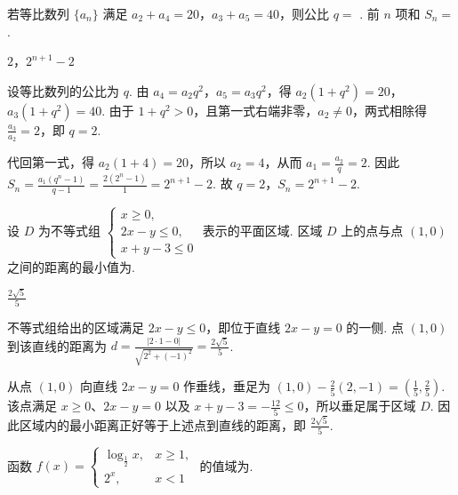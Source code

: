 \begin{problem}
若等比数列 \(\{a_{n}\}\) 满足 \(a_{2} + a_{4} = 20\)，\(a_{3} + a_{5} = 40\)，则公比 \(q = \)\fillinblank{} . 前 \(n\) 项和 \(S_{n} =\)\fillinblank{}.
\end{problem}

\begin{answer}
\(2\)，\(2^{n+1}-2\)
\end{answer}

\begin{solution}
设等比数列的公比为 \(q\). 由 \(a_4=a_2q^2\)，\(a_5=a_3q^2\)，得 \(a_2(1+q^2)=20\)，\(a_3(1+q^2)=40\). 由于 \(1+q^2>0\)，且第一式右端非零，\(a_2\neq0\)，两式相除得 \(\frac{a_3}{a_2}=2\)，即 \(q=2\).

代回第一式，得 \(a_2(1+4)=20\)，所以 \(a_2=4\)，从而 \(a_1=\frac{a_2}{q}=2\). 因此 \(S_n=\frac{a_1(q^n-1)}{q-1}=\frac{2(2^n-1)}{1}=2^{n+1}-2\). 故 \(q=2\)，\(S_n=2^{n+1}-2\).
\end{solution}

\begin{problem}
设 \(D\) 为不等式组 \(\begin{cases}
x \geqslant 0,\\
2x - y \leqslant 0,\\
x + y - 3 \leqslant 0
\end{cases}\) 表示的平面区域. 区域 \(D\) 上的点与点 \((1,0)\) 之间的距离的最小值为\fillinblank{}.
\end{problem}

\begin{answer}
\(\frac{2\sqrt{5}}{5}\)
\end{answer}

\begin{solution}
不等式组给出的区域满足 \(2x-y\leqslant0\)，即位于直线 \(2x-y=0\) 的一侧. 点 \((1,0)\) 到该直线的距离为 \(d=\frac{|2\cdot1-0|}{\sqrt{2^2+(-1)^2}}=\frac{2\sqrt{5}}{5}\).

从点 \((1,0)\) 向直线 \(2x-y=0\) 作垂线，垂足为 \(\left(1,0\right)-\frac{2}{5}(2,-1)=\left(\frac{1}{5},\frac{2}{5}\right)\). 该点满足 \(x\geqslant0\)、\(2x-y=0\) 以及 \(x+y-3=-\frac{12}{5}\leqslant0\)，所以垂足属于区域 \(D\). 因此区域内的最小距离正好等于上述点到直线的距离，即 \(\frac{2\sqrt{5}}{5}\).
\end{solution}

\begin{problem}
函数 \( f(x)=\begin{cases}
\log_{\frac{1}{2}}x,&x\geqslant1,\\
2^{x},&x<1
\end{cases} \) 的值域为\fillinblank{}.
\end{problem}

